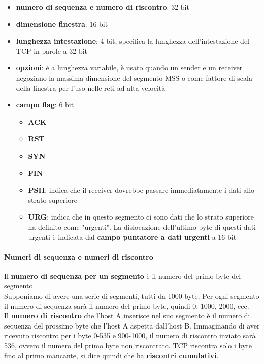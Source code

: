 \documentclass[11pt,a4paper]{book}
\begin{document}
\begin{itemize}
	\item \textbf{numero di sequenza e numero di riscontro}: 32 bit
	\item \textbf{dimensione finestra}: 16 bit
	\item \textbf{lunghezza intestazione}: 4 bit, specifica la lunghezza dell'intestazione del TCP in parole a 32 bit
	\item \textbf{opzioni}: è a lunghezza variabile, è usato quando un sender e un receiver negoziano la massima dimensione del segmento MSS o come fattore di scala della finestra per l'uso nelle reti ad alta velocità
	\item \textbf{campo flag}: 6 bit
		\begin{itemize}
			\item \textbf{ACK}
			\item \textbf{RST}
			\item \textbf{SYN}
			\item \textbf{FIN}
			\item \textbf{PSH}: indica che il receiver dovrebbe passare immediatamente i dati allo strato superiore
			\item \textbf{URG}: indica che in questo segmento ci sono dati che lo strato superiore ha definito come "urgenti". La dislocazione dell'ultimo byte di questi dati urgenti è indicata dal \textbf{campo puntatore a dati urgenti} a 16 bit
		\end{itemize}
\end{itemize}
\paragraph{Numeri di sequenza e numeri di riscontro}
Il \textbf{numero di sequenza per un segmento} è il numero del primo byte del segmento. \\
Supponiamo di avere una serie di segmenti, tutti da 1000 byte. Per ogni segmento il numero di sequenza sarà il numero del primo byte, quindi 0, 1000, 2000, ecc.\\
Il \textbf{numero di riscontro} che l'host A inserisce nel suo segmento è il numero di sequenza del prossimo byte che l'host A aspetta dall'host B. Immaginando di aver ricevuto riscontro per i byte 0-535 e 900-1000, il numero di riscontro inviato sarà 536, ovvero il numero del primo byte non riscontrato. TCP riscontra solo i byte fino al primo mancante, si dice quindi che ha \textbf{riscontri cumulativi}. \\
\end{document}
